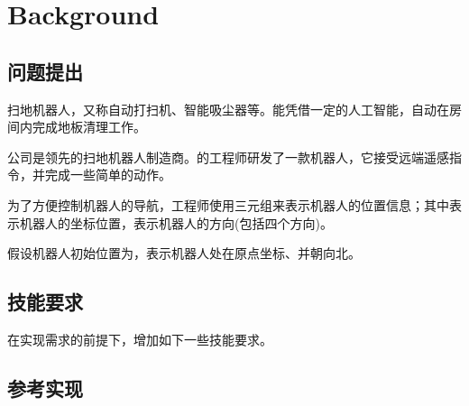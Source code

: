 \begin{savequote}[45mm]
\end{savequote}

\chapter{Background} 
\label{ch:background}

\section{问题提出}

\begin{content}

扫地机器人，又称自动打扫机、智能吸尘器等。能凭借一定的人工智能，自动在房间内完成地板清理工作。

公司是领先的扫地机器人制造商。的工程师研发了一款机器人，它接受远端遥感指令，并完成一些简单的动作。

为了方便控制机器人的导航，工程师使用三元组来表示机器人的位置信息；其中表示机器人的坐标位置，表示机器人的方向(包括四个方向)。

假设机器人初始位置为，表示机器人处在原点坐标、并朝向北。

\end{content}

\section{技能要求}

\begin{content}

在实现需求的前提下，增加如下一些技能要求。

\begin{enum}
\end{enum}

\end{content}

\section{参考实现}

